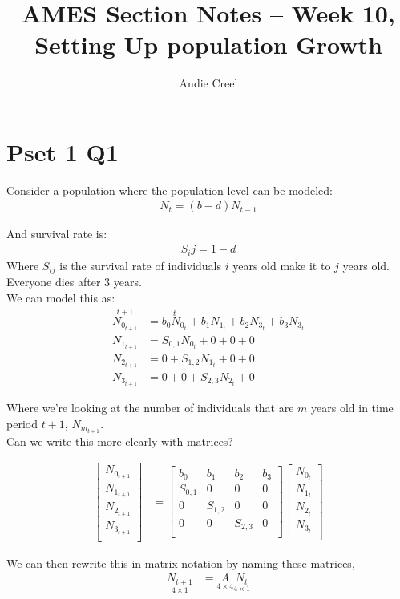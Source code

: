 \documentclass{article}
\title{AMES Section Notes -- Week 10, Setting Up population Growth}
\author{Andie Creel}
\begin{document}
\maketitle



\section{Pset 1 Q1}
Consider a population where the population level can be modeled: 
\begin{align}
    N_t = (b-d)N_{t-1}
\end{align}

And survival rate is:
\begin{align}
    S_ij = 1 -d
\end{align}
Where $S_{ij}$ is the survival rate of individuals $i$ years old make it to $j$ years old.\\

Everyone dies after 3 years. \\

We can model this as:
\begin{align}
    \overset{t+1}{N_{0_{t+1}}} &= \overset{t}{b_0 N_{0_t}} + b_1  N_{1_t}+ b_2  N_{3_t} + b_3  N_{3_t}\\
    N_{1_{t+1}} &= S_{0,1} N_{0_t} + 0 + 0 + 0\\
    N_{2_{t+1}} &= 0+ S_{1,2} N_{1_t}+ 0 + 0\\
    N_{3_{t+1}} &= 0 + 0 + S_{2,3} N_{2_t} + 0
\end{align}

Where we're looking at the number of individuals that are $m$ years old in time period $t+1$, $N_{m_{t+1}}$.\\

Can we write this more clearly with matrices?

\begin{align}
    \begin{bmatrix}
        N_{0_{t+1}}\\
        N_{1_{t+1}} \\
        N_{2_{t+1}} \\
        N_{3_{t+1}}\\
    \end{bmatrix} &= 
    \begin{bmatrix}
        b_0 & b_1 & b_2 & b_3\\
        S_{0,1} & 0 & 0 &0 \\
        0 & S_{1,2} & 0 &0 \\
        0 & 0 & S_{2,3} &0 \\
    \end{bmatrix}
    \begin{bmatrix}
        N_{0_{t}}\\
        N_{1_{t}} \\
        N_{2_{t}} \\
        N_{3_{t}}\\
    \end{bmatrix} 
\end{align}

We can then rewrite this in matrix notation by naming these matrices, 
\begin{align}
    \underset{4 \times 1}{N_{t+1}} &= \underset{4 \times 4}{A} \underset{4 \times 1}{N_t}
\end{align}
\end{document}
